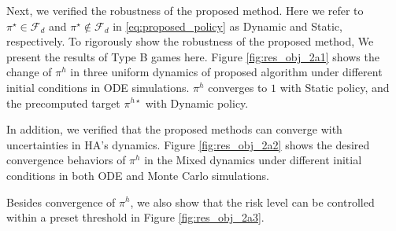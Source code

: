 \documentclass[letterpaper]{article} %
\begin{document}
Next, we verified the robustness of the proposed method.
Here we refer to $\pi^{\star}\in \mathcal{F}_d$ and $\pi^{\star}\notin \mathcal{F}_d$ in \ref{eq:proposed_policy} as Dynamic and Static, respectively. To rigorously show the robustness of the proposed method, We present the results of Type B games here. Figure \ref{fig:res_obj_2a1} shows the change of $\pi^h$ in three uniform dynamics of proposed algorithm under different initial conditions in ODE simulations. $\pi^h$ converges to $1$ with Static policy, and the precomputed target $\pi^{h \star}$ with Dynamic policy. 

In addition, we verified that the proposed methods can converge with uncertainties in HA's dynamics. {Figure \ref{fig:res_obj_2a2}} shows the desired convergence behaviors of $\pi^h$ in the Mixed dynamics under different initial conditions in both ODE and Monte Carlo simulations. 

Besides convergence of $\pi^h$, we also show that the risk level can be controlled within a preset threshold in {Figure \ref{fig:res_obj_2a3}}. 
\end{document}

